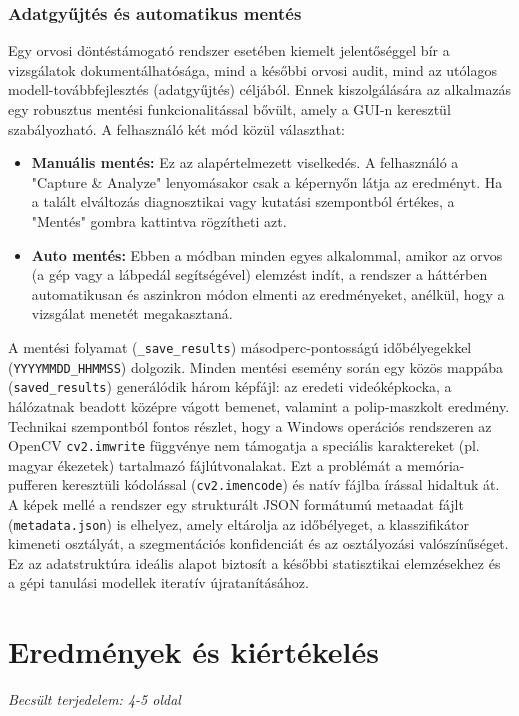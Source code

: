 \documentclass[12pt, a4paper]{report}
\begin{document}
\subsection{Adatgyűjtés és automatikus mentés}
Egy orvosi döntéstámogató rendszer esetében kiemelt jelentőséggel bír a vizsgálatok dokumentálhatósága, mind a későbbi orvosi audit, mind az utólagos modell-továbbfejlesztés (adatgyűjtés) céljából. Ennek kiszolgálására az alkalmazás egy robusztus mentési funkcionalitással bővült, amely a GUI-n keresztül szabályozható. A felhasználó két mód közül választhat:
\begin{itemize}
    \item \textbf{Manuális mentés:} Ez az alapértelmezett viselkedés. A felhasználó a "Capture \& Analyze" lenyomásakor csak a képernyőn látja az eredményt. Ha a talált elváltozás diagnosztikai vagy kutatási szempontból értékes, a "Mentés" gombra kattintva rögzítheti azt.
    \item \textbf{Auto mentés:} Ebben a módban minden egyes alkalommal, amikor az orvos (a gép vagy a lábpedál segítségével) elemzést indít, a rendszer a háttérben automatikusan és aszinkron módon elmenti az eredményeket, anélkül, hogy a vizsgálat menetét megakasztaná.
\end{itemize}
A mentési folyamat (\texttt{\_save\_results}) másodperc-pontosságú időbélyegekkel (\texttt{YYYYMMDD\_HHMMSS}) dolgozik. Minden mentési esemény során egy közös mappába (\texttt{saved\_results}) generálódik három képfájl: az eredeti videóképkocka, a hálózatnak beadott középre vágott bemenet, valamint a polip-maszkolt eredmény. Technikai szempontból fontos részlet, hogy a Windows operációs rendszeren az OpenCV \texttt{cv2.imwrite} függvénye nem támogatja a speciális karaktereket (pl. magyar ékezetek) tartalmazó fájlútvonalakat. Ezt a problémát a memória-pufferen keresztüli kódolással (\texttt{cv2.imencode}) és natív fájlba írással hidaltuk át. A képek mellé a rendszer egy strukturált JSON formátumú metaadat fájlt (\texttt{metadata.json}) is elhelyez, amely eltárolja az időbélyeget, a klasszifikátor kimeneti osztályát, a szegmentációs konfidenciát és az osztályozási valószínűséget. Ez az adatstruktúra ideális alapot biztosít a későbbi statisztikai elemzésekhez és a gépi tanulási modellek iteratív újratanításához.

\chapter{Eredmények és kiértékelés}
\textit{Becsült terjedelem: 4-5 oldal}
\end{document}
